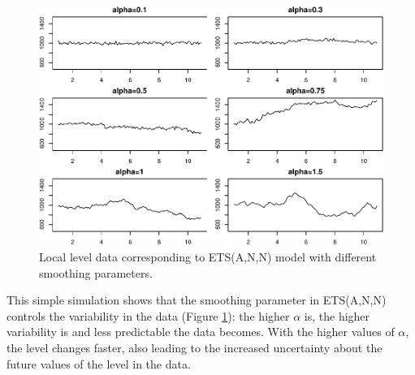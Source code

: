 \documentclass[
]{book}
\newenvironment{Shaded}{\begin{snugshade}}{\end{snugshade}}
\newcommand{\AttributeTok}[1]{\textcolor[rgb]{0.77,0.63,0.00}{#1}}
\newcommand{\ControlFlowTok}[1]{\textcolor[rgb]{0.13,0.29,0.53}{\textbf{#1}}}
\newcommand{\DecValTok}[1]{\textcolor[rgb]{0.00,0.00,0.81}{#1}}
\newcommand{\FunctionTok}[1]{\textcolor[rgb]{0.00,0.00,0.00}{#1}}
\newcommand{\NormalTok}[1]{#1}
\newcommand{\SpecialCharTok}[1]{\textcolor[rgb]{0.00,0.00,0.00}{#1}}
\newcommand{\StringTok}[1]{\textcolor[rgb]{0.31,0.60,0.02}{#1}}
\theoremstyle{definition}
\theoremstyle{definition}
\theoremstyle{definition}
\theoremstyle{definition}
\theoremstyle{remark}
\begin{document}
\begin{Shaded}
\end{Shaded}

\begin{figure}
\centering
\includegraphics{adam_files/figure-latex/DGPetsANNExample-1.pdf}
\caption{\label{fig:DGPetsANNExample}Local level data corresponding to ETS(A,N,N) model with different smoothing parameters.}
\end{figure}

This simple simulation shows that the smoothing parameter in ETS(A,N,N) controls the variability in the data (Figure \ref{fig:DGPetsANNExample}): the higher \(\alpha\) is, the higher variability is and less predictable the data becomes. With the higher values of \(\alpha\), the level changes faster, also leading to the increased uncertainty about the future values of the level in the data.
\end{document}
